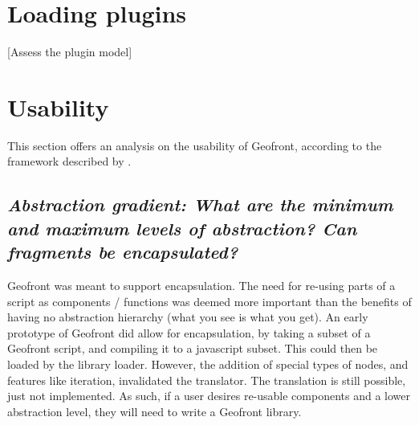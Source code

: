 \section{Loading plugins}
\label{sec:analyses:loading}

\begin{note}
  
\end{note}

[Assess the plugin model]






\section{Usability}
\label{sec:analyses:utilization}

This section offers an analysis on the usability of Geofront, according to the framework described by \cite[]{green_usability_1996}.



\subsection*{\emph{Abstraction gradient: What are the minimum and maximum levels of abstraction? Can fragments be encapsulated?}}

Geofront was meant to support encapsulation. 
The need for re-using parts of a script as components / functions was deemed more important than the benefits of having no abstraction hierarchy (what you see is what you get).
An early prototype of Geofront did allow for encapsulation, by taking a subset of a Geofront script, and compiling it to a javascript subset. This could then be loaded by the library loader. 
However, the addition of special types of nodes, and features like iteration, invalidated the  translator.
The translation is still possible, just not implemented.  
As such, if a user desires re-usable components and a lower abstraction level, they will need to write a Geofront library.


